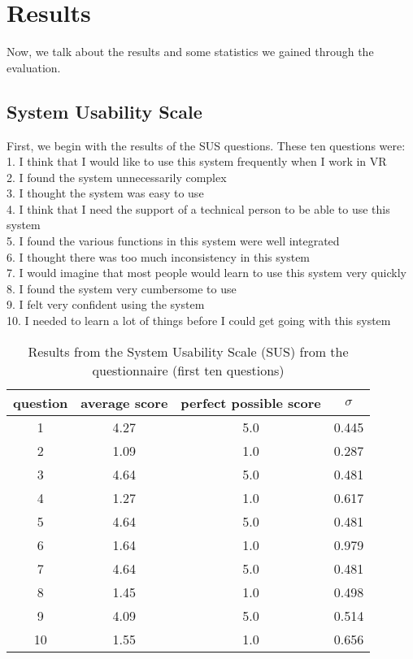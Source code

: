 \section{Results}
Now, we talk about the results and some statistics we gained through the evaluation.\\

\subsection{System Usability Scale}
First, we begin with the results of the SUS questions. These ten questions were:\\
1. I think that I would like to use this system frequently when I work in VR\\
2. I found the system unnecessarily complex\\
3. I thought the system was easy to use \\
4. I think that I need the support of a technical person to be able to use this system\\
5. I found the various functions in this system were well integrated\\
6. I thought there was too much inconsistency in this system\\
7. I would imagine that most people would learn to use this system very quickly\\
8. I found the system very cumbersome to use\\
9. I felt very confident using the system\\
10. I needed to learn a lot of things before I could get going with this system
\iffalse
\begin{table}[ht!]
    \centering
    \caption{Results from the System Usability Scale (SUS) from the questionnaire (first ten questions)}
    \begin{tabular}{cccc} \toprule
        question&average score&perfect possible score&$\sigma$\\ \midrule
        1 & 4.27 & 5.0 & 0.445\\ 
        2 & 1.09 & 1.0 & 0.287\\
        3 & 4.64 & 5.0 & 0.481\\ 
        4 & 1.27 & 1.0 & 0.617\\
        5 & 4.64 & 5.0 & 0.481\\
        6 & 1.64 & 1.0 & 0.979\\
        7 & 4.64 & 5.0 & 0.481\\
        8 & 1.45 & 1.0 & 0.498\\
        9 & 4.09 & 5.0 & 0.514\\
        10 & 1.55 & 1.0 & 0.656\\
        \bottomrule
    \end{tabular}
    \label{tab:table}
\end{table}
